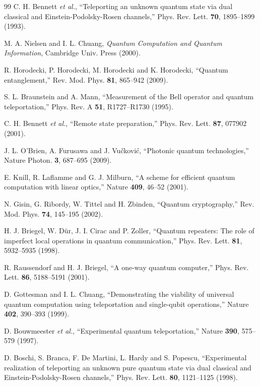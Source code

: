 \documentclass{optica-article}
\begin{document}
\renewcommand{\refname}{5.\,\,\,\,References}
    \begin{thebibliography}{99}
         C. H. Bennett {\it et al.}, ``Teleporting an unknown quantum state via dual classical and Einstein-Podolsky-Rosen channels,'' Phys. Rev. Lett. {\bf 70}, 1895--1899 (1993).
        
         M. A. Nielsen and I. L. Chuang, {\it Quantum Computation and Quantum Information}, Cambridge Univ. Press (2000).
        
         R. Horodecki, P. Horodecki, M. Horodecki and K. Horodecki, ``Quantum entanglement,'' Rev. Mod. Phys. {\bf 81}, 865--942 (2009).
        
         S. L. Braunstein and A. Mann, ``Measurement of the Bell operator and quantum teleportation,'' Phys. Rev. A {\bf 51}, R1727--R1730 (1995).
        
         C. H. Bennett {\it et al.}, ``Remote state preparation,'' Phys. Rev. Lett. {\bf 87}, 077902 (2001).
        
         J. L. O'Brien, A. Furusawa and J. Vučković, ``Photonic quantum technologies,'' Nature Photon. {\bf 3}, 687--695 (2009).
        
         E. Knill, R. Laflamme and G. J. Milburn, ``A scheme for efficient quantum computation with linear optics,'' Nature {\bf 409}, 46--52 (2001).
        
         N. Gisin, G. Ribordy, W. Tittel and H. Zbinden, ``Quantum cryptography,'' Rev. Mod. Phys. {\bf 74}, 145--195 (2002).
        
         H. J. Briegel, W. Dür, J. I. Cirac and P. Zoller, ``Quantum repeaters: The role of imperfect local operations in quantum communication,'' Phys. Rev. Lett. {\bf 81}, 5932--5935 (1998).
        
         R. Raussendorf and H. J. Briegel, ``A one-way quantum computer,'' Phys. Rev. Lett. {\bf 86}, 5188--5191 (2001).
        
         D. Gottesman and I. L. Chuang, ``Demonstrating the viability of universal quantum computation using teleportation and single-qubit operations,'' Nature {\bf 402}, 390--393 (1999).
        
         D. Bouwmeester {\it et al.}, ``Experimental quantum teleportation,'' Nature {\bf 390}, 575--579 (1997).
        
         D. Boschi, S. Branca, F. De Martini, L. Hardy and S. Popescu, ``Experimental realization of teleporting an unknown pure quantum state via dual classical and Einstein-Podolsky-Rosen channels,'' Phys. Rev. Lett. {\bf 80}, 1121--1125 (1998).
        

\end{thebibliography}
\end{document}
